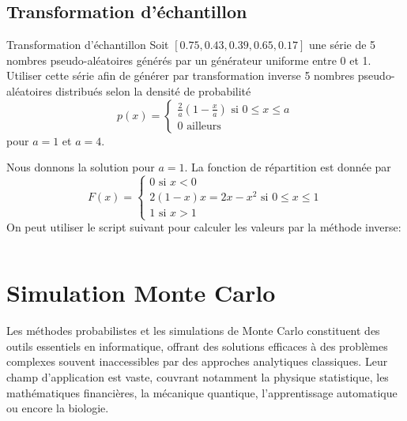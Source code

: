             \subsection{Transformation d'échantillon}
                \begin{exercise}{Transformation d'échantillon}
                    Soit $[0.75, 0.43, 0.39, 0.65, 0.17]$ une série de 5 nombres pseudo-aléatoires générés par un générateur uniforme entre 0 et 1. Utiliser cette série afin de générer par transformation inverse 5 nombres pseudo-aléatoires distribués selon la densité de probabilité
                    \begin{equation}
                        p(x)=
                        \begin{cases}
                            \frac{2}{a}(1-\frac{x}{a})\text{ si $0\leq x\leq a$}\\
                            0 \text{ ailleurs}
                        \end{cases}
                    \end{equation}
                    pour $a=1$ et $a=4$.
                \end{exercise}
                Nous donnons la solution pour $a=1$. La fonction de répartition est donnée par
                \begin{equation}
                    F(x)=
                    \begin{cases}
                        0\text{ si $x<0$}\\
                        2(1-x)x = 2x-x^2\text{ si $0\leq x\leq 1$}\\
                        1 \text{ si $x>1$}
                    \end{cases}
                \end{equation}
                On peut utiliser le script suivant pour calculer les valeurs par la méthode inverse:
                \inputminted{python}{codes/exercice_inverse_1.py}

    \section{Simulation Monte Carlo}
        Les méthodes probabilistes et les simulations de Monte Carlo constituent des outils essentiels en informatique, offrant des solutions efficaces à des problèmes complexes souvent inaccessibles par des approches analytiques classiques. Leur champ d’application est vaste, couvrant notamment la physique statistique, les mathématiques financières, la mécanique quantique, l’apprentissage automatique ou encore la biologie.

